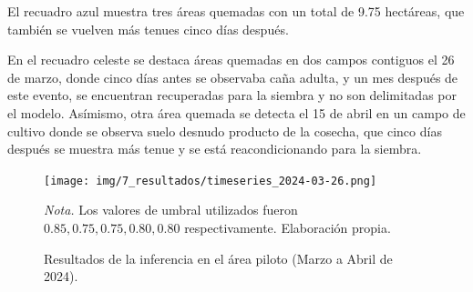 El recuadro azul muestra tres áreas quemadas con un total de 9.75 hectáreas, que también se vuelven más tenues cinco días después. 

En el recuadro celeste se destaca áreas quemadas en dos campos contiguos el 26 de marzo, donde 
cinco días antes se observaba caña adulta, y un mes después de este evento, se encuentran recuperadas para la siembra y no son delimitadas por el modelo. Asímismo, otra área quemada se detecta el 15 de abril en un campo de cultivo donde se observa suelo desnudo
producto de la cosecha, que cinco días después se muestra más tenue y se está reacondicionando para la siembra.

\begin{figure}[H]
    \centering
    \caption{Resultados de la inferencia en el área piloto (Marzo a Abril de 2024).}
    \label{fig:inference_marzo_abril}
    \texttt{[image: img/7\_resultados/timeseries\_2024-03-26.png]}
    \begin{flushleft}
        \textit{Nota.} Los valores de umbral utilizados fueron $0.85, 0.75, 0.75, 0.80, 0.80$ respectivamente. Elaboración propia.
        \vspace{-\baselineskip}
    \end{flushleft}
\end{figure}


